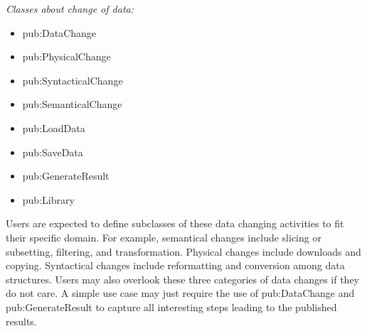 \hspace{-1em}\emph{Classes about change of data:}
\begin{itemize}
	\item pub:DataChange
	\item pub:PhysicalChange
	\item pub:SyntacticalChange
	\item pub:SemanticalChange
	\item pub:LoadData
	\item pub:SaveData
	\item pub:GenerateResult
	\item pub:Library
\end{itemize}
Users are expected to define subclasses of these data changing activities to fit their specific domain. For example, semantical changes include slicing or subsetting, filtering, and transformation. Physical changes include downloads and copying. Syntactical changes include reformatting and conversion among data structures. Users may also overlook these three categories of data changes if they do not care. A simple use case may just require the use of pub:DataChange and pub:GenerateResult to capture all interesting steps leading to the published results.

